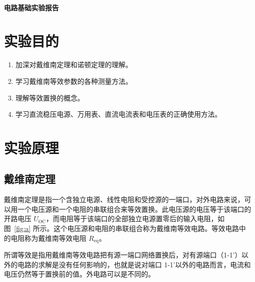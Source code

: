 \documentclass[a4paper,utf8]{article}
\begin{document}
\begin{center}
    {\mbox{}\\[7em]\bfseries\songti%
    电路基础实验报告}\\[34mm]
\end{center}
\newpage
\section{实验目的}
\begin{enumerate}
    \item 加深对戴维南定理和诺顿定理的理解。
    \item 学习戴维南等效参数的各种测量方法。
    \item 理解等效置换的概念。
    \item 学习直流稳压电源、万用表、直流电流表和电压表的正确使用方法。
\end{enumerate}

\section{实验原理}%
\subsection{戴维南定理}
戴维南定理是指一个含独立电源、线性电阻和受控源的一端口，对外电路来说，可以用一个电压源和一个电阻的串联组合来等效置换。此电压源的电压等于该端口的开路电压 $U_\text{OC}$，而电阻等于该端口的全部独立电源置零后的输入电阻，如图~\ref{fig:a} 所示。这个电压源和电阻的串联组合称为戴维南等效电路。等效电路中的电阻称为戴维南等效电阻 $R_\text{eq}$。\par
所谓等效是指用戴维南等效电路把有源一端口网络置换后，对有源端口（1-1’）以外的电路的求解是没有任何影响的，也就是说对端口 1-1’以外的电路而言，电流和电压仍然等于置换前的值。外电路可以是不同的。
\end{document}
